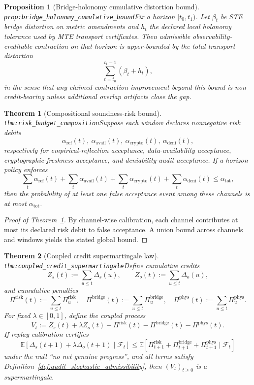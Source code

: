 \documentclass[11pt]{article}
\theoremstyle{definition}
\theoremstyle{plain}
\newtheorem{proposition}{Proposition}
\newtheorem{theorem}{Theorem}
\newcommand{\STE}{\textsf{STE}}
\newcommand{\MTE}{\textsf{MTE}}
\newcommand{\lbl}[1]{\texttt{\footnotesize\nolinkurl{#1}}}
\newcommand{\DefLabel}[1]{\hfill{\small\lbl{#1}}}
\newcommand{\deltas}{\Delta_s}
\newcommand{\deltao}{\Delta_o}
\newcommand{\Zo}{Z_o}
\newcommand{\Zs}{Z_s}
\newcommand{\PiRisk}{\Pi^{\mathrm{risk}}}
\newcommand{\PiBridge}{\Pi^{\mathrm{bridge}}}
\newcommand{\PiPhys}{\Pi^{\mathrm{phys}}}
\newcommand{\Vcouple}{V}
\begin{document}
\begin{proposition}[Bridge-holonomy cumulative distortion bound]\DefLabel{prop:bridge_holonomy_cumulative_bound}\label{prop:bridge_holonomy_cumulative_bound}
Fix a horizon $[t_0,t_1)$. Let $\beta_t$ be \STE{} bridge distortion on metric amendments and $h_t$ the declared local holonomy tolerance used by \MTE{} transport certificates.
Then admissible observability-creditable contraction on that horizon is upper-bounded by the total transport distortion
\[
\sum_{t=t_0}^{t_1-1}(\beta_t+h_t),
\]
in the sense that any claimed contraction improvement beyond this bound is non-credit-bearing unless additional overlap artifacts close the gap.
\end{proposition}

\begin{theorem}[Compositional soundness-risk bound]\DefLabel{thm:risk_budget_composition}\label{thm:risk_budget_composition}
Suppose each window declares nonnegative risk debits
\[
\alpha_{\mathrm{ref}}(t),\ \alpha_{\mathrm{avail}}(t),\ \alpha_{\mathrm{crypto}}(t),\ \alpha_{\mathrm{deni}}(t),
\]
respectively for empirical-reflection acceptance, data-availability acceptance, cryptographic-freshness acceptance, and deniability-audit acceptance.
If a horizon policy enforces
\[
\sum_t \alpha_{\mathrm{ref}}(t)+\sum_t \alpha_{\mathrm{avail}}(t)+\sum_t \alpha_{\mathrm{crypto}}(t)+\sum_t \alpha_{\mathrm{deni}}(t)\le \alpha_{\mathrm{tot}},
\]
then the probability of at least one false acceptance event among these channels is at most $\alpha_{\mathrm{tot}}$.
\end{theorem}

\begin{proof}[Proof of Theorem~\ref{thm:risk_budget_composition}]
By channel-wise calibration, each channel contributes at most its declared risk debit to false acceptance.
A union bound across channels and windows yields the stated global bound.
\end{proof}

\begin{theorem}[Coupled credit supermartingale law]\DefLabel{thm:coupled_credit_supermartingale}\label{thm:coupled_credit_supermartingale}
Define cumulative credits
\[
\Zs(t):=\sum_{u\le t}\deltas(u),\qquad \Zo(t):=\sum_{u\le t}\deltao(u),
\]
and cumulative penalties
\[
\PiRisk(t):=\sum_{u\le t}\PiRisk_u,\quad \PiBridge(t):=\sum_{u\le t}\PiBridge_u,\quad \PiPhys(t):=\sum_{u\le t}\PiPhys_u.
\]
For fixed $\lambda\in[0,1]$, define the coupled process
\[
\Vcouple_t:=\Zs(t)+\lambda \Zo(t)-\PiRisk(t)-\PiBridge(t)-\PiPhys(t).
\]
If replay calibration certifies
\[
\mathbb{E}[\deltas(t+1)+\lambda\deltao(t+1)\mid\mathcal{F}_t]
\le
\mathbb{E}[\PiRisk_{t+1}+\PiBridge_{t+1}+\PiPhys_{t+1}\mid\mathcal{F}_t]
\]
under the null ``no net genuine progress'', and all terms satisfy Definition~\ref{def:audit_stochastic_admissibility}, then $(\Vcouple_t)_{t\ge 0}$ is a supermartingale.
\end{theorem}
\end{document}
